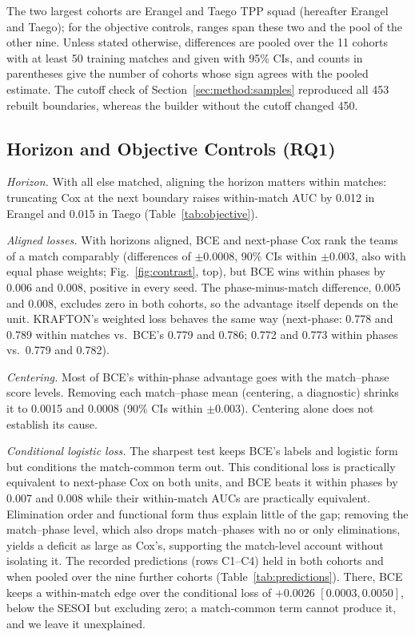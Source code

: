 \documentclass[sigconf,anonymous]{acmart}
\begin{document}
The two largest cohorts are Erangel and Taego TPP squad (hereafter Erangel and Taego); for the objective controls, ranges span these two and the pool of the other nine. Unless stated otherwise, differences are pooled over the 11 cohorts with at least 50 training matches and given with 95\% CIs, and counts in parentheses give the number of cohorts whose sign agrees with the pooled estimate. The cutoff check of Section~\ref{sec:method:samples} reproduced all 453 rebuilt boundaries, whereas the builder without the cutoff changed 450.

\subsection{Horizon and Objective Controls (RQ1)}
\label{sec:results:rq1}
\emph{Horizon.} With all else matched, aligning the horizon matters within matches: truncating Cox at the next boundary raises within-match AUC by 0.012 in Erangel and 0.015 in Taego (Table~\ref{tab:objective}).

\emph{Aligned losses.} With horizons aligned, BCE and next-phase Cox rank the teams of a match comparably (differences of $\pm0.0008$, 90\% CIs within $\pm0.003$, also with equal phase weights; Fig.~\ref{fig:contrast}, top), but BCE wins within phases by 0.006 and 0.008, positive in every seed. The phase-minus-match difference, 0.005 and 0.008, excludes zero in both cohorts, so the advantage itself depends on the unit. KRAFTON's weighted loss behaves the same way (next-phase: 0.778 and 0.789 within matches vs.\ BCE's 0.779 and 0.786; 0.772 and 0.773 within phases vs.\ 0.779 and 0.782).

\emph{Centering.} Most of BCE's within-phase advantage goes with the match--phase score levels. Removing each match--phase mean (centering, a diagnostic) shrinks it to 0.0015 and 0.0008 (90\% CIs within $\pm0.003$). Centering alone does not establish its cause.

\emph{Conditional logistic loss.} The sharpest test keeps BCE's labels and logistic form but conditions the match-common term out. This conditional loss is practically equivalent to next-phase Cox on both units, and BCE beats it within phases by 0.007 and 0.008 while their within-match AUCs are practically equivalent. Elimination order and functional form thus explain little of the gap; removing the match--phase level, which also drops match--phases with no or only eliminations, yields a deficit as large as Cox's, supporting the match-level account without isolating it. The recorded predictions (rows C1--C4) held in both cohorts and when pooled over the nine further cohorts (Table~\ref{tab:predictions}). There, BCE keeps a within-match edge over the conditional loss of $+0.0026$ $[0.0003,\allowbreak 0.0050]$, below the SESOI but excluding zero; a match-common term cannot produce it, and we leave it unexplained.
\end{document}
